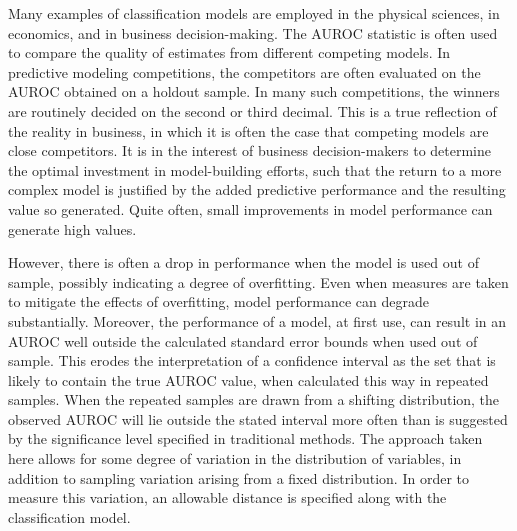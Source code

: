 
Many examples of classification models are employed in the physical sciences, in economics, and in business decision-making.
The AUROC statistic is often used to compare the quality of estimates from different competing models.
In predictive modeling competitions, the competitors are often evaluated on the AUROC obtained on a holdout sample.
In many such competitions, the winners are routinely decided on the second or third decimal.
This is a true reflection of the reality in business, in which it is often the case that competing models are close competitors.
It is in the interest of business decision-makers to determine the optimal investment in model-building efforts,
such that the return to a more complex model is justified by the added predictive performance and the resulting value so generated.
Quite often, small improvements in model performance can generate high values.


However, there is often a drop in performance when the model is used out of sample, possibly indicating a degree of overfitting.
Even when measures are taken to mitigate the effects of overfitting,
model performance can degrade substantially.
Moreover, the performance of a model, at first use, can result in an AUROC well outside the calculated standard error bounds when used out of sample.
This erodes the interpretation of a confidence interval as the set that is likely to contain the true AUROC value, when calculated this way in repeated samples.
When the repeated samples are drawn from a shifting distribution, the observed AUROC will lie outside the stated interval more often than is suggested by the significance level specified in traditional methods.
The approach taken here allows for some degree of variation in the distribution of variables, in addition to sampling variation arising from a fixed distribution.
In order to measure this variation, an allowable distance is specified along with the classification model.


